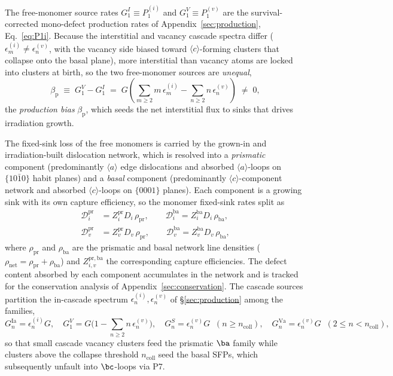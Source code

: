 The free-monomer source rates $G_1^{I}\equiv P_1^{(i)}$ and $G_1^{V}\equiv P_1^{(v)}$ are the survival-corrected mono-defect production rates of Appendix~\ref{sec:production}, Eq.~\eqref{eq:P1i}. Because the interstitial and vacancy cascade spectra differ ($\epsilon_m^{(i)}\neq\epsilon_n^{(v)}$, with the vacancy side biased toward $\langle c\rangle$-forming clusters that collapse onto the basal plane), more interstitial than vacancy atoms are locked into clusters at birth, so the two free-monomer sources are \emph{unequal},
\begin{equation}
  \beta_{\mathrm{p}}\;\equiv\;G_1^{V}-G_1^{I}\;=\;G\!\left(\sum_{m\ge2}m\,\epsilon_m^{(i)}-\sum_{n\ge2}n\,\epsilon_n^{(v)}\right)\;\neq\;0,
  \label{eq:prod_bias}
\end{equation}
the \emph{production bias} $\beta_{\mathrm{p}}$, which seeds the net interstitial flux to sinks that drives irradiation growth.

The fixed-sink loss of the free monomers is carried by the grown-in and irradiation-built dislocation network, which is resolved into a \emph{prismatic} component (predominantly $\langle a\rangle$ edge dislocations and absorbed $\langle a\rangle$-loops on $\{10\bar10\}$ habit planes) and a \emph{basal} component (predominantly $\langle c\rangle$-component network and absorbed $\langle c\rangle$-loops on $\{0001\}$ planes). Each component is a growing sink with its own capture efficiency, so the monomer fixed-sink rates split as
\begin{align}
  \mathcal{D}_i^{\mathrm{pr}} &= Z_i^{\mathrm{pr}}D_i\,\rho_{\mathrm{pr}},\qquad \mathcal{D}_i^{\mathrm{ba}} = Z_i^{\mathrm{ba}}D_i\,\rho_{\mathrm{ba}},
  \label{eq:Dnet_i}\\
  \mathcal{D}_v^{\mathrm{pr}} &= Z_v^{\mathrm{pr}}D_v\,\rho_{\mathrm{pr}},\qquad \mathcal{D}_v^{\mathrm{ba}} = Z_v^{\mathrm{ba}}D_v\,\rho_{\mathrm{ba}},
  \label{eq:Dnet_v}
\end{align}
where $\rho_{\mathrm{pr}}$ and $\rho_{\mathrm{ba}}$ are the prismatic and basal network line densities ($\rho_{\mathrm{net}}=\rho_{\mathrm{pr}}+\rho_{\mathrm{ba}}$) and $Z_{i,v}^{\mathrm{pr,ba}}$ the corresponding capture efficiencies. The defect content absorbed by each component accumulates in the network and is tracked for the conservation analysis of Appendix~\ref{sec:conservation}.
The cascade sources partition the in-cascade spectrum
$\epsilon_n^{(i)},\epsilon_n^{(v)}$ of \S\ref{sec:production} among the
families,
\begin{equation}\label{eq:source_terms}
    G_n^{\mathrm{Ia}}=\epsilon_n^{(i)}G,\quad
    G_1^{V}=G\Big(1-\!\sum_{n\ge2}n\,\epsilon_n^{(v)}\Big),\quad
    G_n^{S}=\epsilon_n^{(v)}G\;\;(n\ge n_{\mathrm{coll}}),\quad
    G_n^{\mathrm{Va}}=\epsilon_n^{(v)}G\;\;(2\le n<n_{\mathrm{coll}}),
\end{equation}
so that small cascade vacancy clusters feed the prismatic $\ba$ family
while clusters above the collapse threshold $n_{\mathrm{coll}}$ seed the
basal SFPs, which subsequently unfault into $\bc$-loops via P7.

